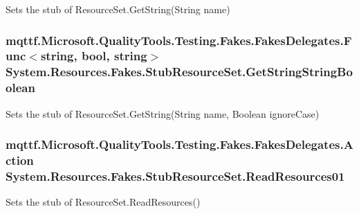 Sets the stub of Resource\-Set.\-Get\-String(\-String name)

\hypertarget{class_system_1_1_resources_1_1_fakes_1_1_stub_resource_set_ae7fb5f1263a5b122b536a4a27f4979c3}{
\subsubsection[{Get\-String\-String\-Boolean}]{\setlength{\rightskip}{0pt plus 5cm}mqttf.\-Microsoft.\-Quality\-Tools.\-Testing.\-Fakes.\-Fakes\-Delegates.\-Func$<$string, bool, string$>$ System.\-Resources.\-Fakes.\-Stub\-Resource\-Set.\-Get\-String\-String\-Boolean}}\label{class_system_1_1_resources_1_1_fakes_1_1_stub_resource_set_ae7fb5f1263a5b122b536a4a27f4979c3}


Sets the stub of Resource\-Set.\-Get\-String(\-String name, Boolean ignore\-Case)

\hypertarget{class_system_1_1_resources_1_1_fakes_1_1_stub_resource_set_a1b45548ba3f93a8e286a7384b0ae924c}{
\subsubsection[{Read\-Resources01}]{\setlength{\rightskip}{0pt plus 5cm}mqttf.\-Microsoft.\-Quality\-Tools.\-Testing.\-Fakes.\-Fakes\-Delegates.\-Action System.\-Resources.\-Fakes.\-Stub\-Resource\-Set.\-Read\-Resources01}}\label{class_system_1_1_resources_1_1_fakes_1_1_stub_resource_set_a1b45548ba3f93a8e286a7384b0ae924c}


Sets the stub of Resource\-Set.\-Read\-Resources()



